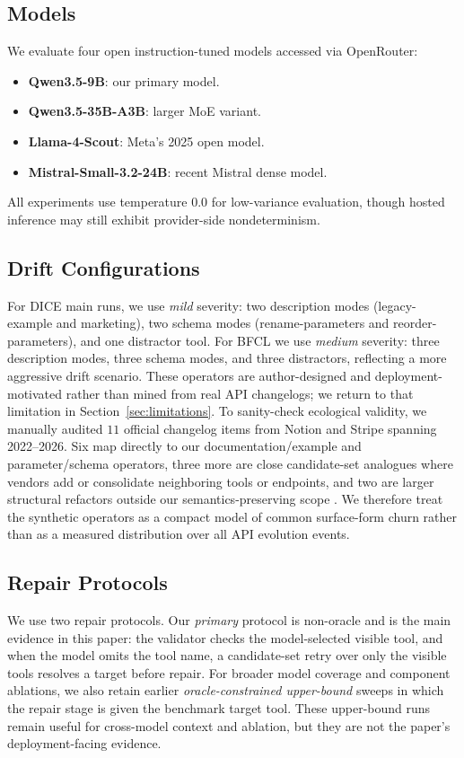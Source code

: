 \documentclass{svproc}
\begin{document}
\subsection{Models}
We evaluate four open instruction-tuned models accessed via OpenRouter:

\begin{itemize}
\item \textbf{Qwen3.5-9B}: our primary model.
\item \textbf{Qwen3.5-35B-A3B}: larger MoE variant.
\item \textbf{Llama-4-Scout}: Meta's 2025 open model.
\item \textbf{Mistral-Small-3.2-24B}: recent Mistral dense model.
\end{itemize}

All experiments use temperature $0.0$ for low-variance evaluation, though hosted
inference may still exhibit provider-side nondeterminism.

\subsection{Drift Configurations}
For DICE main runs, we use \emph{mild} severity: two description modes
(legacy-example and marketing), two schema modes
(rename-parameters and reorder-parameters), and one distractor
tool. For BFCL we use \emph{medium} severity: three description modes, three schema
modes, and three distractors, reflecting a more aggressive drift scenario. These
operators are author-designed and deployment-motivated rather than mined from real
API changelogs; we return to that limitation in Section~\ref{sec:limitations}.
To sanity-check ecological validity, we manually audited $11$ official changelog
items from Notion and Stripe spanning 2022--2026. Six map directly to our
documentation/example and parameter/schema operators, three more are close
candidate-set analogues where vendors add or consolidate neighboring tools or
endpoints, and two are larger structural refactors outside our
semantics-preserving scope
\cite{notionchangelog2026,stripecheckout2022,stripedefaultvalue2025,stripeinvoicepreview2025,stripedelaydays2025}. We
therefore treat the synthetic operators as a compact model of common surface-form
churn rather than as a measured distribution over all API evolution events.

\subsection{Repair Protocols}
We use two repair protocols. Our \emph{primary} protocol is non-oracle and is the
main evidence in this paper: the validator checks the model-selected visible tool,
and when the model omits the tool name, a candidate-set retry over only the visible
tools resolves a target before repair. For broader model coverage and component
ablations, we also retain earlier \emph{oracle-constrained upper-bound} sweeps in
which the repair stage is given the benchmark target tool. These upper-bound runs
remain useful for cross-model context and ablation, but they are not the paper's
deployment-facing evidence.
\end{document}
